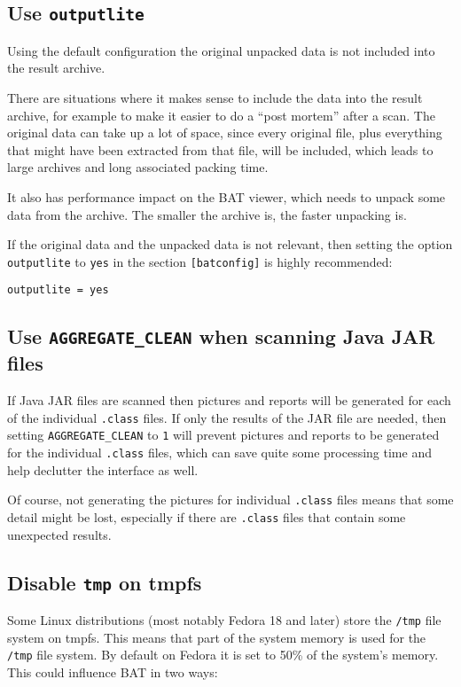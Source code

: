 \documentclass[10pt,a4paper]{article}
\begin{document}
\subsection{Use \texttt{outputlite}}

Using the default configuration the original unpacked data is not included into
the result archive.

There are situations where it makes sense to include the data into the result
archive, for example to make it easier to do a ``post mortem'' after a scan.
The original data can take up a lot of space, since every original file, plus
everything that might have been extracted from that file, will be included,
which leads to large archives and long associated packing time.

It also has performance impact on the BAT viewer, which needs to unpack some
data from the archive. The smaller the archive is, the faster unpacking is.

If the original data and the unpacked data is not relevant, then setting the
option \texttt{outputlite} to \texttt{yes} in the section \texttt{[batconfig]}
is highly recommended:

\begin{verbatim}
outputlite = yes
\end{verbatim}

\subsection{Use \texttt{AGGREGATE\_CLEAN} when scanning Java JAR files}

If Java JAR files are scanned then pictures and reports will be generated for
each of the individual \texttt{.class} files. If only the results of the JAR
file are needed, then setting \texttt{AGGREGATE\_CLEAN} to \texttt{1} will
prevent pictures and reports to be generated for the individual \texttt{.class}
files, which can save quite some processing time and help declutter the
interface as well.

Of course, not generating the pictures for individual \texttt{.class} files
means that some detail might be lost, especially if there are \texttt{.class}
files that contain some unexpected results.

\subsection{Disable \texttt{tmp} on tmpfs}

Some Linux distributions (most notably Fedora 18 and later) store the
\texttt{/tmp} file system on tmpfs. This means that part of the system memory
is used for the \texttt{/tmp} file system. By default on Fedora it is
set to 50\% of the system's memory. This could influence BAT in two ways:
\end{document}
